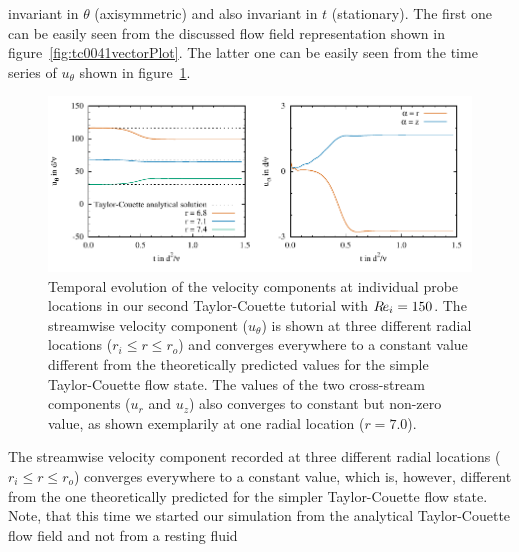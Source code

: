 \documentclass[a4paper, 11pt, DIV=11]{scrartcl}
\begin{document}
invariant in $\theta$ (axisymmetric) and also invariant in $t$ (stationary). The
first one can be easily seen from the discussed flow field representation shown
in figure~\ref{fig:tc0041vectorPlot}. The latter one can be easily seen from the
time series of $u_{\theta}$ shown in figure~\ref{fig:tc0041probes}.
\begin{figure}[htb]
\centering
\includegraphics[scale=1.00]{figures/tc0041/probes}
\caption{Temporal evolution of the velocity components at individual probe 
locations in our second Taylor-Couette tutorial  with $R\hspace{-0.1em}e_{i}=\num{150}$.
The streamwise velocity component ($u_{\theta}$) is shown 
at three different radial locations ($r_{i}\le r\le r_{o}$) and converges 
everywhere to a constant value different from the theoretically predicted values for
the simple Taylor-Couette flow state. The values of the two cross-stream components
($u_r$ and $u_z$) also converges to constant but non-zero value, as shown exemplarily
at one radial location ($r=\num{7.0}$).}
\label{fig:tc0041probes}
\end{figure}
The streamwise velocity component recorded at three different radial
locations ($r_{i}\le r\le r_{o}$) converges everywhere to a constant
value, which is, however, different from the one theoretically predicted
for the simpler Taylor-Couette flow state. Note, that this time we
started our simulation from the analytical Taylor-Couette flow field
and not from a resting fluid
\end{document}
